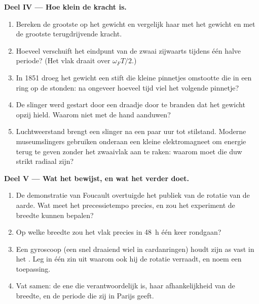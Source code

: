\begin{problem}
\medskip
\noindent\textbf{Deel IV --- Hoe klein de kracht is.}
\begin{enumerate}[resume]
  \item Bereken de grootste  op het gewicht en vergelijk haar
        met het gewicht en met de grootste terugdrijvende kracht.
  \item Hoeveel verschuift het eindpunt van de zwaai zijwaarts tijdens
        één halve periode? (Het vlak draait over $\omega_FT/2$.)
  \item In 1851 droeg het gewicht een stift die kleine pinnetjes omstootte
        die in een ring op de  stonden: na ongeveer hoeveel tijd
        viel het volgende pinnetje?
  \item De slinger werd gestart door een draadje door te branden dat het gewicht
        opzij hield. Waarom niet met de hand aanduwen?
  \item Luchtweerstand brengt een slinger na een paar uur tot stilstand. Moderne
        museumslingers gebruiken onderaan een kleine elektromagneet om
        energie terug te geven zonder het zwaaivlak aan te raken: waarom moet die
        duw strikt radiaal zijn?
\end{enumerate}

\medskip
\noindent\textbf{Deel V --- Wat het bewijst, en wat het verder doet.}
\begin{enumerate}[resume]
  \item De demonstratie van Foucault overtuigde het publiek van de rotatie
        van de aarde. Wat meet het precessietempo precies, en
        zou het experiment de breedte kunnen bepalen?
  \item Op welke breedte zou het vlak precies in \qty{48}{h} één keer rondgaan?
  \item Een gyroscoop (een snel draaiend wiel in cardanringen) houdt zijn as
        vast in het . Leg in één zin uit waarom ook hij
        de rotatie verraadt, en noem een toepassing.
  \item Vat samen: de ene  die verantwoordelijk is, haar afhankelijkheid
        van de breedte, en de periode die zij in Parijs geeft.
\end{enumerate}
\end{problem}
